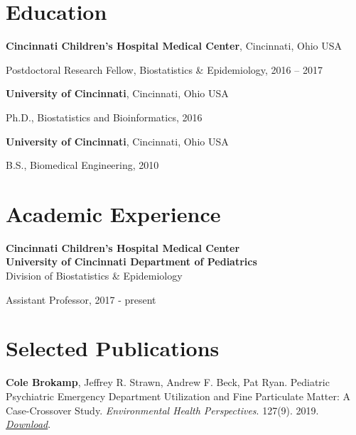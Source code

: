 \documentclass[margin,line]{res}
\newenvironment{list1}{
  \begin{list}{\ding{113}}{%
      \setlength{\itemsep}{0in}
      \setlength{\parsep}{0in} \setlength{\parskip}{0in}
      \setlength{\topsep}{0in} \setlength{\partopsep}{0in}
      \setlength{\leftmargin}{0.17in}}}{\end{list}}
\begin{document}
\begin{resume}
\section{\sc Education}

{\bf Cincinnati Children's Hospital Medical Center}, Cincinnati, Ohio USA \\
\vspace*{-.1in}
\begin{list1}
\item[]Postdoctoral Research Fellow, Biostatistics \& Epidemiology, 2016 -- 2017
\end{list1}

{\bf University of Cincinnati}, Cincinnati, Ohio USA \\
\vspace*{-.1in}
\begin{list1}
\item[]Ph.D., Biostatistics and Bioinformatics, 2016
\end{list1}

{\bf University of Cincinnati}, Cincinnati, Ohio USA\\
\vspace*{-.1in}
\begin{list1}
\item[]B.S., Biomedical Engineering, 2010
\end{list1}


\section{\sc Academic Experience}

{\bf Cincinnati Children's Hospital Medical Center}\\
{\bf University of Cincinnati Department of Pediatrics}\\
Division of Biostatistics \& Epidemiology\\
\vspace*{-.1in}
\begin{list1}
    \item[] Assistant Professor, 2017 - present
\end{list1}


\section{\sc Selected Publications}

\textbf{Cole Brokamp}, Jeffrey R. Strawn, Andrew F. Beck, Pat Ryan.
Pediatric Psychiatric Emergency Department Utilization and Fine
Particulate Matter: A Case-Crossover Study. \emph{Environmental Health
  Perspectives}. 127(9). 2019.
\href{https://s3.amazonaws.com/colebrokamp-website/publications/Brokamp_EHP_2019.pdf}{\emph{Download}}.


\end{resume}
\end{document}
